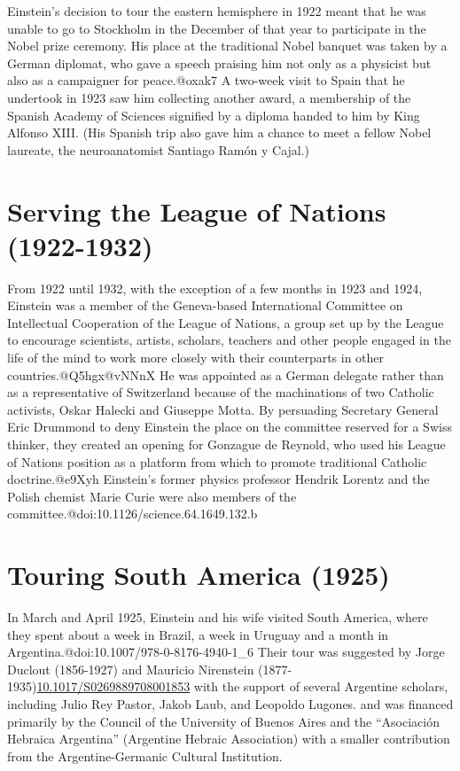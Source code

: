 \documentclass[twoside]{memoir}
\begin{document}
Einstein's decision to tour the eastern hemisphere in 1922 meant that he was unable to go to Stockholm in the December of that year to participate in the Nobel prize ceremony. His place at the traditional Nobel banquet was taken by a German diplomat, who gave a speech praising him not only as a physicist but also as a campaigner for peace.@oxak7 A two-week visit to Spain that he undertook in 1923 saw him collecting another award, a membership of the Spanish Academy of Sciences signified by a diploma handed to him by King Alfonso XIII. (His Spanish trip also gave him a chance to meet a fellow Nobel laureate, the neuroanatomist Santiago Ramón y Cajal.)\cite{w74nv}
\chapter{Serving the League of Nations (1922-1932)}
From 1922 until 1932, with the exception of a few months in 1923 and 1924, Einstein was a member of the Geneva-based International Committee on Intellectual Cooperation of the League of Nations, a group set up by the League to encourage scientists, artists, scholars, teachers and other people engaged in the life of the mind to work more closely with their counterparts in other countries.@Q5hgx@vNNnX He was appointed as a German delegate rather than as a representative of Switzerland because of the machinations of two Catholic activists, Oskar Halecki and Giuseppe Motta. By persuading Secretary General Eric Drummond to deny Einstein the place on the committee reserved for a Swiss thinker, they created an opening for Gonzague de Reynold, who used his League of Nations position as a platform from which to promote traditional Catholic doctrine.@e9Xyh Einstein's former physics professor Hendrik Lorentz and the Polish chemist Marie Curie were also members of the committee.@doi:10.1126/science.64.1649.132.b
\chapter{Touring South America (1925)}
In March and April 1925, Einstein and his wife visited South America, where they spent about a week in Brazil, a week in Uruguay and a month in Argentina.@doi:10.1007/978-0-8176-4940-1\_6 Their tour was suggested by Jorge Duclout (1856-1927) and Mauricio Nirenstein (1877-1935)\href{https://doi.org/10.1017/S0269889708001853}{10.1017/S0269889708001853} with the support of several Argentine scholars, including Julio Rey Pastor, Jakob Laub, and Leopoldo Lugones. and was financed primarily by the Council of the University of Buenos Aires and the \enquote{Asociación Hebraica Argentina} (Argentine Hebraic Association) with a smaller contribution from the Argentine-Germanic Cultural Institution.
\end{document}
